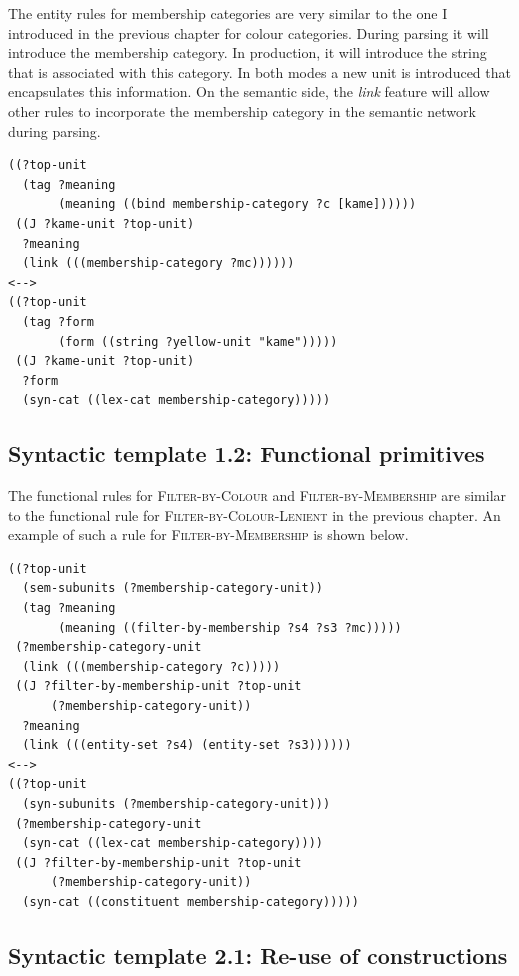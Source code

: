 The entity rules for membership categories are very similar to the one
I introduced in the previous chapter for colour categories. During
parsing it will introduce the membership category. In production, it
will introduce the string that is associated with this category. In
both modes a new unit is introduced that encapsulates this
information. On the semantic side, the \emph{link} feature
will allow
other rules to incorporate the membership category in the semantic
network during parsing.

\footnotesize
\begin{Verbatim}[frame=lines, label=Entity rule for kame]
((?top-unit
  (tag ?meaning 
       (meaning ((bind membership-category ?c [kame])))))
 ((J ?kame-unit ?top-unit)
  ?meaning
  (link (((membership-category ?mc))))))
<-->
((?top-unit
  (tag ?form 
       (form ((string ?yellow-unit "kame")))))
 ((J ?kame-unit ?top-unit)
  ?form
  (syn-cat ((lex-cat membership-category)))))
\end{Verbatim}
\normalsize

\subsection{Syntactic template 1.2: Functional primitives}

The functional rules for \textsc{Filter-by-Colour} and
\textsc{Filter-by-Membership} are similar to the functional rule for 
\textsc{Filter-by-Colour-Lenient} in the previous chapter. An example
of such a rule for \textsc{Filter-by-Membership} is shown below.

\footnotesize
\begin{Verbatim}[frame=lines, label=Functional rule for Filter-by-Membership]
((?top-unit
  (sem-subunits (?membership-category-unit)) 
  (tag ?meaning
       (meaning ((filter-by-membership ?s4 ?s3 ?mc)))))
 (?membership-category-unit 
  (link (((membership-category ?c)))))
 ((J ?filter-by-membership-unit ?top-unit 
      (?membership-category-unit))
  ?meaning
  (link (((entity-set ?s4) (entity-set ?s3))))))
<-->
((?top-unit 
  (syn-subunits (?membership-category-unit)))
 (?membership-category-unit 
  (syn-cat ((lex-cat membership-category))))
 ((J ?filter-by-membership-unit ?top-unit 
      (?membership-category-unit))
  (syn-cat ((constituent membership-category)))))
\end{Verbatim}
\normalsize

\subsection{Syntactic template 2.1: Re-use of constructions}

